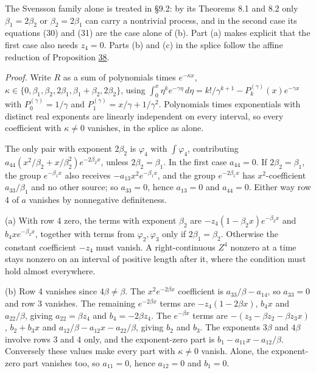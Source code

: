 \documentclass[11pt]{article}
\begin{document}
The Svensson family alone is treated in \cite{filipovic2000exponential} §9.2: by its Theorems 8.1 and 8.2 only \(\beta_1=2\beta_2\) or \(\beta_2=2\beta_1\) can carry a nontrivial process, and in the second case its equations (30) and (31) are the case alone of (b). Part (a) makes explicit that the first case also needs \(z_4=0\). Parts (b) and (c) in the splice follow the affine reduction of Proposition \hyperref[res:Proposition-38]{38}.

\emph{Proof.} Write \(R\) as a sum of polynomials times \(e^{-\kappa x}\), \(\kappa\in\{0,\beta_1,\beta_2,2\beta_1,\beta_1+\beta_2,2\beta_2\}\), using \(\int_0^x\eta^ke^{-\gamma\eta}\,d\eta=k!/\gamma^{k+1}-P^{(\gamma)}_k(x)e^{-\gamma x}\) with \(P^{(\gamma)}_0=1/\gamma\) and \(P^{(\gamma)}_1=x/\gamma+1/\gamma^2\). Polynomials times exponentials with distinct real exponents are linearly independent on every interval, so every coefficient with \(\kappa\neq0\) vanishes, in the splice as alone.

The only pair with exponent \(2\beta_2\) is \(\varphi_4\) with \(\int\varphi_4\), contributing \(a_{44}(x^2/\beta_2+x/\beta_2^2)e^{-2\beta_2x}\), unless \(2\beta_2=\beta_1\). In the first case \(a_{44}=0\). If \(2\beta_2=\beta_1\), the group \(e^{-\beta_1x}\) also receives \(-a_{13}x^2e^{-\beta_1x}\), and the group \(e^{-2\beta_1x}\) has \(x^2\)-coefficient \(a_{33}/\beta_1\) and no other source; so \(a_{33}=0\), hence \(a_{13}=0\) and \(a_{44}=0\). Either way row 4 of \(a\) vanishes by nonnegative definiteness.

(a) With row 4 zero, the terms with exponent \(\beta_2\) are \(-z_4(1-\beta_2x)e^{-\beta_2x}\) and \(b_4xe^{-\beta_2x}\), together with terms from \(\varphi_2,\varphi_3\) only if \(2\beta_1=\beta_2\). Otherwise the constant coefficient \(-z_4\) must vanish. A right-continuous \(Z^4\) nonzero at a time stays nonzero on an interval of positive length after it, where the condition must hold almost everywhere.

(b) Row 4 vanishes since \(4\beta\neq\beta\). The \(x^2e^{-2\beta x}\) coefficient is \(a_{33}/\beta-a_{14}\), so \(a_{33}=0\) and row 3 vanishes. The remaining \(e^{-2\beta x}\) terms are \(-z_4(1-2\beta x)\), \(b_4x\) and \(a_{22}/\beta\), giving \(a_{22}=\beta z_4\) and \(b_4=-2\beta z_4\). The \(e^{-\beta x}\) terms are \(-(z_3-\beta z_2-\beta z_3x)\), \(b_2+b_3x\) and \(a_{12}/\beta-a_{12}x-a_{22}/\beta\), giving \(b_2\) and \(b_3\). The exponents \(3\beta\) and \(4\beta\) involve rows 3 and 4 only, and the exponent-zero part is \(b_1-a_{11}x-a_{12}/\beta\). Conversely these values make every part with \(\kappa\neq0\) vanish. Alone, the exponent-zero part vanishes too, so \(a_{11}=0\), hence \(a_{12}=0\) and \(b_1=0\).
\end{document}
